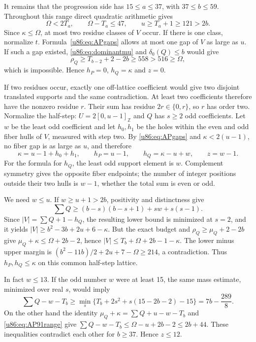 \documentclass[11pt,a4paper]{article}
\theoremstyle{remark}
\newcommand{\Z}{\mathbb Z}
\begin{document}
It remains that the progression side has $15\le a\le37$, with
$37\le b\le59$. Throughout this range direct quadratic arithmetic gives
\begin{equation}\label{u86:eq:AP91range}
 \Omega<2T_a,\qquad \Omega-T_a\le47,
 \qquad u\ge T_a+1\ge121>2b.
\end{equation}
Since $\kappa\le\Omega$, at most two residue classes of $V$ occur.
If there is one class, normalize $t$. Formula~\eqref{u86:eq:APgaps} allows
at most one gap of $V$ as large as $u$. If such a gap existed,
\eqref{u86:eq:dominantmu} and $\delta_0(Q)\le b$ would give
\[
 \rho_Q\ge T_{b-2}+2-2b\ge558>516\ge\Omega,
\]
which is impossible. Hence $h_P=0$, $h_Q=\kappa$ and $z=0$.

If two residues occur, exactly one off-lattice coefficient would give
two disjoint translated supports and the same contradiction. At least
two coefficients therefore have the nonzero residue $r$. Their sum has
residue $2r\in\{0,r\}$, so $r$ has order two. Normalize the half-step:
$U=2[0,u-1]_{\Z}$ and $Q$ has $s\ge2$ odd coefficients. Let $w$ be
the least odd coefficient and let $h_0,h_1$ be the holes within the
even and odd fiber hulls of $V$, measured with step two. By
\eqref{u86:eq:APgaps} and $\kappa<2(u-1)$, no fiber gap is as large as $u$,
and therefore
\[
 \kappa=u-1+h_0+h_1,\qquad
 h_P=u-1,\qquad h_Q=\kappa-u+w,\qquad z=w-1.
\]
For the formula for $h_Q$, the least odd support element is $w$.
Complement symmetry gives the opposite fiber endpoints; the number of
integer positions outside their two hulls is $w-1$, whether the total
sum is even or odd.

We need $w\le u$. If $w\ge u+1>2b$, positivity and distinctness give
\[
 \sum Q\ge(b-s)(b-s+1)+sw+s(s-1).
\]
Since $|V|=\sum Q+1-h_Q$, the resulting lower bound is minimized at
$s=2$, and it yields
$|V|\ge b^2-3b+2u+6-\kappa$.
But the exact budget and $\rho_Q\ge\mu_Q+2-2b$ give
$\mu_Q+\kappa\le\Omega+2b-2$, hence
$|V|\le T_b+\Omega+2b-1-\kappa$.
The lower minus upper margin is
$(b^2-11b)/2+2u+7-\Omega\ge214$, a contradiction.
Thus $h_P,h_Q\le\kappa$ on this common half-step lattice.

In fact $w\le13$. If the odd number $w$ were at least 15, the same
mass estimate, minimized over real $s$, would imply
\[
 \sum Q-w-T_b
 \ge\min_s\{T_b+2s^2+s(15-2b-2)-15\}
 =7b-\frac{289}{8}.
\]
On the other hand the identity
$\mu_Q+\kappa=\sum Q+u-w-T_b$ and \eqref{u86:eq:AP91range} give
$\sum Q-w-T_b\le\Omega-u+2b-2\le2b+44$.
These inequalities contradict each other for $b\ge37$. Hence $z\le12$.
\end{document}
